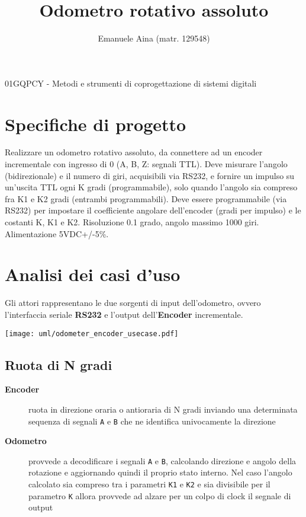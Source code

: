 \documentclass [11pt,a4paper,oneside]{paper}
\title{Odometro rotativo assoluto}
\author{Emanuele Aina (matr. 129548)}
\date{}
\newcommand{\actor}[1]{\textbf{#1}}
\newcommand{\component}[1]{\textbf{#1}}
\newcommand{\identifier}[1]{\texttt{#1}}
\begin{document}
\maketitle

\small{01GQPCY - Metodi e strumenti di coprogettazione di sistemi digitali }

\vskip 1.5cm

\section{Specifiche di progetto}
Realizzare un odometro rotativo assoluto, da connettere ad un encoder
incrementale con ingresso di 0 (A, B, Z: segnali TTL). Deve misurare l'angolo
(bidirezionale) e il numero di giri, acquisibili via RS232, e fornire un
impulso su un'uscita TTL ogni K gradi (programmabile), solo quando l'angolo
sia compreso fra K1 e K2 gradi (entrambi programmabili). Deve essere
programmabile (via RS232) per impostare il coefficiente angolare dell'encoder
(gradi per impulso) e le costanti K, K1 e K2. Risoluzione 0.1 grado, angolo
massimo 1000 giri. Alimentazione 5VDC+/-5\%.

\section{Analisi dei casi d'uso}
Gli attori rappresentano le due sorgenti di input dell'odometro,
ovvero l'interfaccia seriale \component{RS232} e l'output
dell'\component{Encoder} incrementale.

\begin{center}
    \texttt{[image: uml/odometer\_encoder\_usecase.pdf]}
    \label{encoder_usecase}
\end{center}

\subsection{Ruota di N gradi}
\begin{description}
\item[\actor{Encoder}] ruota in direzione oraria o antioraria di N gradi
    inviando una determinata sequenza di segnali \identifier{A} e
    \identifier{B} che ne identifica
    univocamente la direzione
\item[\actor{Odometro}] provvede a decodificare i segnali \identifier{A}
    e \identifier{B}, calcolando direzione e angolo della rotazione e
    aggiornando quindi il proprio stato interno.
    Nel caso l'angolo calcolato sia compreso tra i parametri
    \identifier{K1} e \identifier{K2} e sia divisibile per il parametro
    \identifier{K} allora provvede ad alzare per un colpo di clock
    il segnale di output
\end{description}
\end{document}
